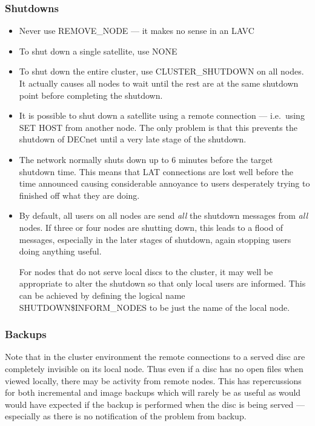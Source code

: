 \subsubsection {Shutdowns}
\begin {itemize}
\item Never use REMOVE\_NODE --- it makes no sense in an LAVC
\item To shut down a single satellite, use NONE
\item To shut down the entire cluster, use CLUSTER\_SHUTDOWN on all nodes.
It actually causes all nodes to wait until the rest are at the same shutdown
point before completing the shutdown.
\item It is possible to shut down a satellite using a remote connection ---
i.e.\ using SET HOST from another node.
The only problem is that this prevents the shutdown of DECnet until a very
late stage of the shutdown.
\item The network normally shuts down up to 6 minutes before the target
shutdown time.
This means that LAT connections are lost well before the time announced
causing considerable annoyance to users desperately trying to finished off
what they are doing.
\item By default, all users on all nodes are send {\em all} the shutdown
messages from {\em all} nodes.
If three or four nodes are shutting down, this leads to a flood of messages,
especially in the later stages of shutdown, again stopping users doing anything
useful.

For nodes that do not serve local discs to the cluster, it may well be
appropriate to alter the shutdown so that only local users are informed.
This can be achieved by defining the logical name SHUTDOWN\$INFORM\_NODES
to be just the name of the local node.
\end {itemize}

\subsubsection {Backups}
Note that in the cluster environment the remote connections to a served
disc are completely invisible on its local node.
Thus even if a disc has no open files when viewed locally, there may be
activity from remote nodes.
This has repercussions for both incremental and image backups which will
rarely be as useful as would would have expected if the backup is performed
when the disc is being served --- especially as there is no notification
of the problem from backup.

